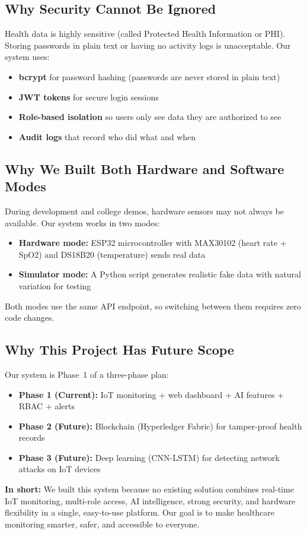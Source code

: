 \documentclass[12pt,a4paper]{article}
\begin{document}
\subsection{Why Security Cannot Be Ignored}
Health data is highly sensitive (called Protected Health Information or PHI). Storing passwords in plain text or having no activity logs is unacceptable. Our system uses:
\begin{itemize}[leftmargin=*]
    \item \textbf{bcrypt} for password hashing (passwords are never stored in plain text)
    \item \textbf{JWT tokens} for secure login sessions
    \item \textbf{Role-based isolation} so users only see data they are authorized to see
    \item \textbf{Audit logs} that record who did what and when
\end{itemize}

\subsection{Why We Built Both Hardware and Software Modes}
During development and college demos, hardware sensors may not always be available. Our system works in two modes:
\begin{itemize}[leftmargin=*]
    \item \textbf{Hardware mode:} ESP32 microcontroller with MAX30102 (heart rate + SpO2) and DS18B20 (temperature) sends real data
    \item \textbf{Simulator mode:} A Python script generates realistic fake data with natural variation for testing
\end{itemize}
Both modes use the same API endpoint, so switching between them requires zero code changes.

\subsection{Why This Project Has Future Scope}
Our system is Phase~1 of a three-phase plan:
\begin{itemize}[leftmargin=*]
    \item \textbf{Phase 1 (Current):} IoT monitoring + web dashboard + AI features + RBAC + alerts
    \item \textbf{Phase 2 (Future):} Blockchain (Hyperledger Fabric) for tamper-proof health records
    \item \textbf{Phase 3 (Future):} Deep learning (CNN-LSTM) for detecting network attacks on IoT devices
\end{itemize}

\vspace{0.3cm}
\noindent \textbf{In short:} We built this system because no existing solution combines real-time IoT monitoring, multi-role access, AI intelligence, strong security, and hardware flexibility in a single, easy-to-use platform. Our goal is to make healthcare monitoring smarter, safer, and accessible to everyone.
\end{document}
